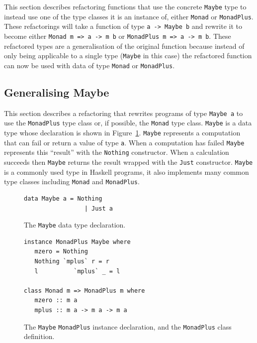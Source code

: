 This section describes refactoring functions that use the concrete \texttt{Maybe} type to instead use one of the type classes it is an instance of, either \texttt{Monad} or \texttt{MonadPlus}. These refactorings will take a function of type \texttt{a -> Maybe b} and rewrite it to become either \texttt{Monad m => a -> m b} or \texttt{MonadPlus m => a -> m b}. These refactored types are a generalisation of the original function because instead of only being applicable to a single type (\texttt{Maybe} in this case) the refactored function can now be used with data of type \texttt{Monad} or \texttt{MonadPlus}.

\subsection{Generalising Maybe}

This section describes a refactoring that rewrites programs of type \texttt{Maybe a} to use the \texttt{MonadPlus} type class or, if possible, the \texttt{Monad} type class. \texttt{Maybe} is a data type whose declaration is shown in Figure~\ref{maybeDecl}. \texttt{Maybe} represents a computation that can fail or return a value of type \texttt{a}. When a computation has failed \texttt{Maybe} represents this ``result'' with the \texttt{Nothing} constructor. When a calculation succeeds then \texttt{Maybe} returns the result wrapped with the \texttt{Just} constructor. \texttt{Maybe} is a commonly used type in Haskell programs, it also implements many common type classes including \texttt{Monad} and \texttt{MonadPlus}.

\begin{figure}[t]
\begin{lstlisting}
data Maybe a = Nothing
                 | Just a
\end{lstlisting}
\caption{The \texttt{Maybe} data type declaration.}
\label{maybeDecl}
\end{figure}


\begin{figure}[t]
\begin{lstlisting}                 
instance MonadPlus Maybe where
   mzero = Nothing
   Nothing `mplus` r = r
   l          `mplus` _ = l
                 
class Monad m => MonadPlus m where
   mzero :: m a
   mplus :: m a -> m a -> m a
\end{lstlisting}
\caption{The \texttt{Maybe} \texttt{MonadPlus} instance declaration, and the \texttt{MonadPlus} class definition.}
\label{maybeMonadPlus}
\end{figure}


